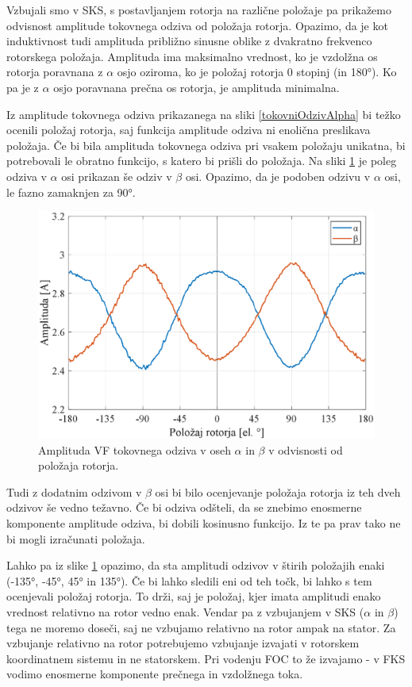 \documentclass[a4paper,twoside,openright,12pt,slovene]{book}
\begin{document}
Vzbujali smo v SKS, s postavljanjem rotorja na različne položaje pa prikažemo odvisnost amplitude tokovnega odziva od položaja rotorja. Opazimo, da je kot induktivnost tudi amplituda približno sinusne 
oblike z dvakratno frekvenco rotorskega položaja. Amplituda ima maksimalno vrednost, ko je vzdolžna os rotorja poravnana z $\alpha$ osjo oziroma, ko je položaj rotorja 0 stopinj (in 180°). 
Ko pa je z $\alpha$ osjo poravnana prečna os rotorja, je amplituda minimalna.  

Iz amplitude tokovnega odziva prikazanega na sliki \ref{tokovniOdzivAlpha} bi težko ocenili položaj rotorja, saj funkcija amplitude odziva ni enolična preslikava položaja. Če bi bila amplituda
tokovnega odziva pri vsakem položaju unikatna, bi potrebovali le obratno funkcijo, s katero bi prišli do položaja. Na sliki \ref{tokovniOdzivAlphaBeta} je poleg odziva v $\alpha$ osi prikazan še odziv v 
$\beta$ osi. Opazimo, da je podoben odzivu v $\alpha$ osi, le fazno zamaknjen za 90°. 

\begin{figure}[!htbp]
    \centering
    \includegraphics[width=0.99\columnwidth]{Slike/tokovniOdzivAlphaBeta.eps}
    \caption{\label{tokovniOdzivAlphaBeta} Amplituda VF tokovnega odziva v oseh $\alpha$ in $\beta$ v odvisnosti od položaja rotorja.}
\end{figure}

Tudi z dodatnim odzivom v $\beta$ osi bi bilo ocenjevanje položaja rotorja iz teh dveh odzivov še vedno težavno. Če bi odziva odšteli, da se znebimo enosmerne komponente amplitude odziva, bi dobili kosinusno
funkcijo. Iz te pa prav tako ne bi mogli izračunati položaja. 

Lahko pa iz slike \ref{tokovniOdzivAlphaBeta} opazimo, da sta amplitudi odzivov v štirih položajih enaki (-135°, -45°, 45° in 135°). Če bi lahko sledili eni od teh točk, bi lahko s tem ocenjevali položaj rotorja. 
To drži, saj je položaj, kjer imata amplitudi enako vrednost relativno na rotor vedno enak. Vendar pa z vzbujanjem v SKS ($\alpha$ in $\beta$) tega ne moremo doseči, saj ne vzbujamo relativno na rotor ampak na
stator. Za vzbujanje relativno na rotor potrebujemo vzbujanje izvajati v rotorskem koordinatnem sistemu in ne statorskem. Pri vodenju FOC to že izvajamo - v FKS vodimo enosmerne komponente prečnega in
vzdolžnega toka. 
\end{document}
